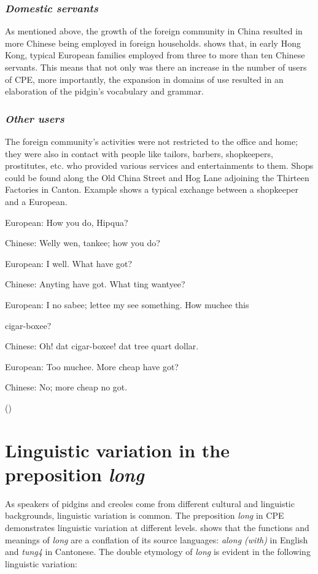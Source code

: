 \documentclass[output=paper]{langsci/langscibook}
\begin{document}
\subsubsection{\textit{Domestic servants}}

As mentioned above, the growth of the foreign community in China resulted in more Chinese being employed in foreign households. \citet[309]{zhang_language_2009} shows that, in early Hong Kong, typical European families employed from three to more than ten Chinese servants. This means that not only was there an increase in the number of users of CPE, more importantly, the expansion in domains of use resulted in an elaboration of the pidgin’s vocabulary and grammar.

\subsubsection{\textit{Other users}}

The foreign community’s activities were not restricted to the office and home; they were also in contact with people like tailors, barbers, shopkeepers, prostitutes, etc. who provided various services and entertainments to them. Shops could be found along the Old China Street and Hog Lane adjoining the Thirteen Factories in Canton. Example  shows a typical exchange between a shopkeeper and a European.

\ea
    \label{ex:7:4}
European:  How you do, Hipqua?

Chinese:    Welly wen, tankee; how you do?

European:  I well. What have got?

Chinese:    Anyting have got. What ting wantyee?

European:  I no sabee; lettee my see something. How muchee this 

cigar-boxee?

Chinese:    Oh! dat cigar-boxee! dat tree quart dollar.

European:  Too muchee. More cheap have got?

Chinese:    No; more cheap no got.

(\citealt[301]{duer_pigeon-english_1860})
\z

\section{Linguistic variation in the preposition \textit{long}}

As speakers of pidgins and creoles come from different cultural and linguistic backgrounds, linguistic variation is common. The preposition \textit{long} in CPE demonstrates linguistic variation at different levels. \citet{li_origins_2011} shows that the functions and meanings of \textit{long} are a conflation of its source languages: \textit{along (with)} in English and \textit{tung4} in Cantonese. The double etymology of \textit{long} is evident in the following linguistic variation:
\end{document}
